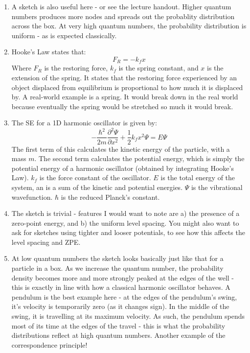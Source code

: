 \documentclass{memoir}[11pt,oneside,a4paper,openany]
\begin{document}
\begin{enumerate}
	\item A sketch is also useful here - or see the lecture handout. Higher quantum numbers produces more nodes and spreads out the probablity distribution across the box. At very high quantum numbers, the probability distribution is uniform - as is expected classically. 
	\item Hooke's Law states that:
		\begin{equation}
			F_R = -k_f x
		\end{equation}
		Where $F_R$ is the restoring force, $k_f$ is the spring constant, and $x$ is the extension of the spring. It states that the restoring force experienced by an object displaced from equilibrium is proportional to how much it is displaced by. A real-world example is a spring. It would break down in the real world because eventually the spring would be stretched so much it would break. 
	\item The SE for a 1D harmonic oscillator is given by:
		\begin{equation}
			-\frac{\hbar^2}{2m}\frac{\partial^2\Psi}{\partial x^2} + \frac{1}{2}k_fx^2\Psi = E\Psi
		\end{equation}
		The first term of this calculates the kinetic energy of the particle, with a mass $m$. The second term calculates the potential energy, which is simply the potential energy of a harmonic oscillator (obtained by integrating Hooke's Law). $k_f$ is the force constant of the oscillator. $E$ is the total energy of the system, an is a sum of the kinetic and potential energies. $\Psi$ is the vibrational wavefunction. $\hbar$ is the reduced Planck's constant.
	\item The sketch is trivial - features I would want to note are a) the presence of a zero-point energy, and b) the uniform level spacing. You might also want to ask for sketches using tighter and looser potentials, to see how this affects the level spacing and ZPE. 
	\item At low quantum numbers the sketch looks basically just like that for a particle in a box. As we increase the quantum number, the probability density becomes more and more strongly peaked at the edges of the well - this is exactly in line with how a classical harmonic oscillator behaves. A pendulum is the best example here - at the edges of the pendulum's swing, it's velocity is temporarily zero (as it changes sign). In the middle of the swing, it is travelling at its maximum velocity. As such, the pendulum spends most of its time at the edges of the travel - this is what the probability distributions reflect at high quantum numbers. Another example of the correspondence principle!

\end{enumerate}
\end{document}
